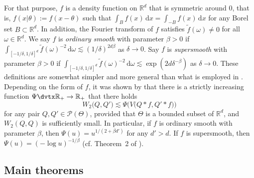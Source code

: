 \documentclass[MSNbibl,number,citesort]{arxbj}
\newcommand{\real}{\mathbb{R}}
\newcommand{\Pcal}{\mathscr{P}}
\begin{document}
For that purpose, $f$ is a density function on $\real^d$ that is
symmetric around 0, that is,
$f(x|\theta) := f(x-\theta)$ such that $\int_{B} f(x) \,\mathrm{d}x = \int_{-B} f(x)\,\mathrm{d}x$
for any Borel set $B \subset\real^d$.
In addition, the Fourier transform of $f$ satisfies
$\tilde{f}(\omega) \neq0$ for all $\omega\in\real^d$.
We say $f$ is \emph{ordinary smooth} with parameter $\beta>0$ if
$\int_{[-1/\delta,1/\delta]^d} \tilde{f}(\omega)^{-2} \,\mathrm
{d}\omega
\lesssim(1/\delta)^{2d\beta}$ as $\delta\rightarrow0$.
Say $f$ is \emph{supersmooth} with parameter $\beta> 0$
if $\int_{[-1/\delta,1/\delta]^d} \tilde{f}(\omega)^{-2} \,\mathrm
{d}\omega
\lesssim\exp(2d\delta^{-\beta})$ as $\delta\rightarrow0$.
These definitions are somewhat simpler and more general than
what is employed in \cite{Nguyen-11}.
Depending on the form of $f$, it was
shown by \cite{Nguyen-11} that
there is a strictly increasing
function $\Psi\dvtx\real_+ \rightarrow\real_+$ that there holds
%
%
\begin{equation}
\label{Eqn-Psi-bound} W_2 \bigl(Q,Q' \bigr) \lesssim\Psi
\bigl(V \bigl(Q*f,Q'*f \bigr) \bigr)
\end{equation}
%
for any pair $Q,Q'\in\Pcal(\Theta)$, provided that
$\Theta$ is a bounded subset of $\real^d$, and $W_2(Q,Q)$
is sufficiently small. In particular,
if $f$ is ordinary smooth with parameter $\beta$, then
$\Psi(u) = u^{1/(2+\beta d')}$ for any $d' > d$.
If $f$ is supersmooth, then
$\Psi(u) = (-\log u)^{-1/\beta}$ (cf. Theorem~2 of \cite{Nguyen-11}).

\subsection{Main theorems}
\end{document}
